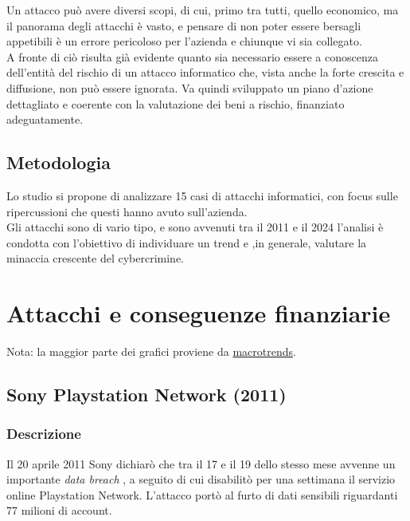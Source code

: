 \documentclass[12pt,a4paper,openright,twoside]{report}
\begin{document}
Un attacco pu\`o avere diversi scopi, di cui, primo tra tutti, quello economico, ma il panorama degli attacchi \`e vasto, e pensare di non poter essere bersagli appetibili \`e un errore pericoloso per l'azienda e chiunque vi sia collegato. \cite{enisa_threat_landscape}\\
A fronte di ci\`o risulta gi\`a evidente quanto sia necessario essere a conoscenza dell'entit\`a del rischio di un attacco informatico che, vista anche la forte crescita e diffusione, non pu\`o essere ignorata. Va quindi sviluppato un piano d'azione dettagliato e coerente con la valutazione dei beni a rischio, finanziato adeguatamente.\\

\section{Metodologia}
Lo studio si propone di analizzare 15 casi di attacchi informatici, con focus sulle ripercussioni che questi hanno avuto sull'azienda.\\
Gli attacchi sono di vario tipo, e sono avvenuti tra il 2011 e il 2024 l'analisi \`e condotta con l'obiettivo di individuare un trend e ,in generale, valutare la minaccia crescente del cybercrimine.\\  
\clearpage{\pagestyle{empty}\cleardoublepage}



\chapter{Attacchi e conseguenze finanziarie}\label{chap:attacks}
Nota: la maggior parte dei grafici proviene da \href{https://www.macrotrends.net/}{macrotrends}.

\section{Sony Playstation Network (2011)}
\subsection{Descrizione}
Il 20 aprile 2011 Sony dichiar\`o che tra il 17 e il 19 dello stesso mese avvenne un importante \textit{data breach} , a seguito di cui disabilit\`o per una settimana il servizio online Playstation Network. L'attacco port\`o al furto di dati sensibili riguardanti 77 milioni di account\cite{Sony_PNT_guardian}\cite{Sony_pnt}.\\
\end{document}
